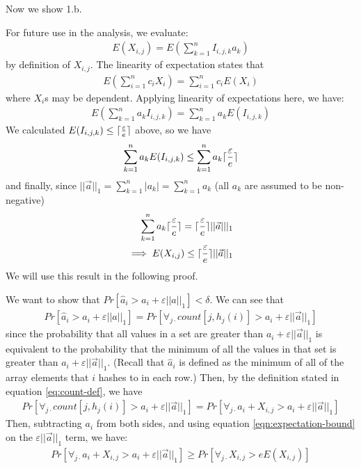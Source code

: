 \documentclass[11pt]{article}
\DeclarePairedDelimiter\ceil{\lceil}{\rceil}
\begin{document}
Now we show 1.b.

For future use in the analysis, we evaluate:
\begin{align}
    E(X_{i, j}) = E\left(\sum_{k = 1}^n I_{i, j, k} a_k\right) 
\end{align}
by definition of $X_{i, j}$. The linearity of expectation states that
\begin{align}
    E(\sum_{i = 1}^{n} c_i X_i) = \sum_{i = 1}^{n} c_i E(X_i)
\end{align}
where $X_i$s may be dependent. Applying linearity of expectations here, we have:
\begin{align}
    E(\sum_{k = 1}^{n} a_k I_{i, j, k}) = \sum_{k = 1}^{n} a_k E(I_{i, j, k}) 
\end{align}
We calculated $E(I_{i, j, k}) \leq \ceil{\frac{\varepsilon}{e}}$ above, so 
we have
\begin{align}
    \sum_{k = 1}^{n} a_k E(I_{i, j, k})  \leq\sum_{k = 1}^{n} a_k \ceil{\frac{\varepsilon}{e}}
\end{align}
and finally, since $||\vec{a}||_1 = \sum_{k = 1}^{n} |a_k| = \sum_{k = 1}^{n} a_k$
(all $a_k$ are assumed to be non-negative)
\begin{align}\label{eqn:expectation-bound}
    \sum_{k = 1}^{n} a_k \ceil{\frac{\varepsilon}{e}} = \ceil{\frac{\varepsilon}{e}} ||\vec{a}|||_1 \nonumber \\
    \implies E(X_{i, j}) \leq \ceil{\frac{\varepsilon}{e}} ||\vec{a}||_1 
\end{align}
We will use this result in the following proof.

We want to show that $Pr[\hat{a}_i > a_i + \varepsilon ||a||_1] < \delta$. We can see that
\begin{align}
    Pr[\hat{a}_i > a_i + \varepsilon ||a||_1] = Pr[\forall_{j \cdot} count[j, h_j(i)] > a_i + \varepsilon ||\vec{a}||_1 ]
\end{align}
since the probability that all values in a set are greater than $a_i + \varepsilon||\vec a||_1$ is equivalent 
to the probability that the minimum of all the values in that set is greater than $a_i + \varepsilon||\vec a||_1$.
(Recall that $\hat a_i$ is defined as the minimum of all of the array elements that $i$
hashes to in each row.) Then, by the definition stated in equation \ref{eq:count-def}, we have
\begin{align}
    Pr[\forall_{j \cdot} count[j, h_j(i)] > a_i + \varepsilon ||\vec{a}||_1] = Pr[\forall_{j \cdot} a_i + X_{i, j} > a_i + \varepsilon ||\vec{a}||_1]
\end{align}
Then, subtracting $a_i$ from both sides, and using equation \ref{eqn:expectation-bound} on the $\varepsilon ||\vec{a}||_1$ term, we have:
\begin{align}
    Pr[\forall_{j \cdot} a_i + X_{i, j} > a_i + \varepsilon ||\vec{a}||_1] \geq Pr[\forall_{j \cdot} X_{i, j} > e E(X_{i, j})]
\end{align}
\end{document}
